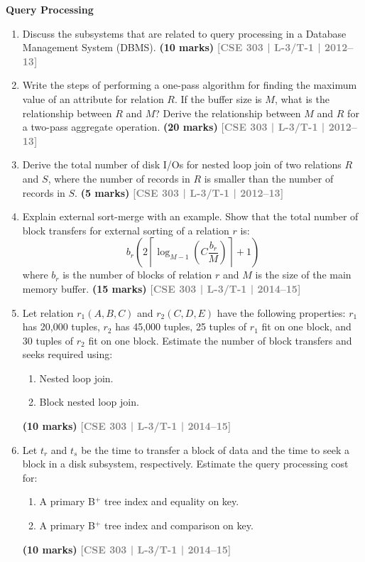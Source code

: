 \documentclass[12pt,a3paper]{article}
\newcommand{\yr}[1]{\hfill\textcolor{gray}{\small\textbf{[#1]}}}
\newcommand{\mk}[1]{\textcolor{orange!70!black}{\small\textbf{(#1 marks)}}}
\newcommand{\subtopic}[2]{%
  \vspace{10pt}
  \noindent\begin{tcolorbox}[colback=#1!8,colframe=#1,boxrule=0.6pt,arc=4pt,
    left=6pt,right=6pt,top=4pt,bottom=4pt]
    \small\bfseries\textcolor{#1}{#2}
  \end{tcolorbox}
  \vspace{2pt}
}
\begin{document}
\subtopic{cD}{Query Processing}
\label{sub:s6-qp}

\begin{enumerate}

\item Discuss the subsystems that are related to query processing in a Database Management System (DBMS).
\mk{10} \yr{CSE 303 | L-3/T-1 | 2012--13}

\item Write the steps of performing a one-pass algorithm for finding the maximum value of an attribute for relation $R$. If the buffer size is $M$, what is the relationship between $R$ and $M$? Derive the relationship between $M$ and $R$ for a two-pass aggregate operation.
\mk{20} \yr{CSE 303 | L-3/T-1 | 2012--13}

\item Derive the total number of disk I/Os for nested loop join of two relations $R$ and $S$, where the number of records in $R$ is smaller than the number of records in $S$.
\mk{5} \yr{CSE 303 | L-3/T-1 | 2012--13}

\item Explain external sort-merge with an example. Show that the total number of block transfers for external sorting of a relation $r$ is:
\[b_r\!\left(2\left\lceil\log_{M-1}(C\dfrac{b_r}{M})\right\rceil + 1\right)\]
where $b_r$ is the number of blocks of relation $r$ and $M$ is the size of the main memory buffer.
\mk{15} \yr{CSE 303 | L-3/T-1 | 2014--15}

\item Let relation $r_1(A, B, C)$ and $r_2(C, D, E)$ have the following properties: $r_1$ has 20,000 tuples, $r_2$ has 45,000 tuples, 25 tuples of $r_1$ fit on one block, and 30 tuples of $r_2$ fit on one block. Estimate the number of block transfers and seeks required using:
\begin{enumerate}
  \item Nested loop join.
  \item Block nested loop join.
\end{enumerate}
\mk{10} \yr{CSE 303 | L-3/T-1 | 2014--15}

\item Let $t_r$ and $t_s$ be the time to transfer a block of data and the time to seek a block in a disk subsystem, respectively. Estimate the query processing cost for:
\begin{enumerate}
  \item A primary B$^+$ tree index and equality on key.
  \item A primary B$^+$ tree index and comparison on key.
\end{enumerate}
\mk{10} \yr{CSE 303 | L-3/T-1 | 2014--15}


\end{enumerate}
\end{document}
